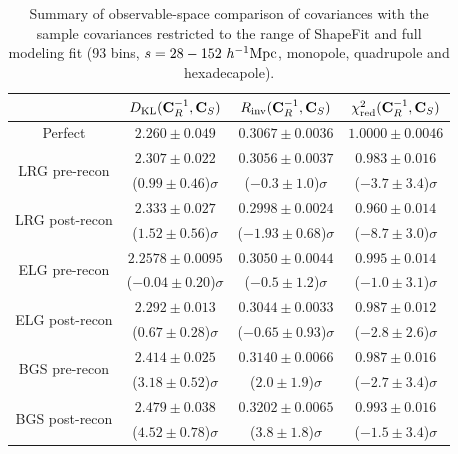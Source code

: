 \begin{table}[tb]
\centering
\begin{tabular}{|c|c|c|c|}
\hline
 & $D_{\rm KL} ({\bf C}_R^{-1}, {\bf C}_S)$ & $R_{\rm inv} ({\bf C}_R^{-1}, {\bf C}_S)$ & $\chi^2_{\rm red} ({\bf C}_R^{-1}, {\bf C}_S)$ \\
\hline
Perfect & $2.260 \pm 0.049$ & $0.3067 \pm 0.0036$ & $1.0000 \pm 0.0046$ \\
\hline
\multirow{2}{*}{LRG pre-recon} & $2.307 \pm 0.022$ & $0.3056 \pm 0.0037$ & $0.983 \pm 0.016$ \\
 & ($0.99 \pm 0.46$)$\sigma$ & ($-0.3 \pm 1.0$)$\sigma$ & ($-3.7 \pm 3.4$)$\sigma$ \\
\hline
\multirow{2}{*}{LRG post-recon} & $2.333 \pm 0.027$ & $0.2998 \pm 0.0024$ & $0.960 \pm 0.014$ \\
 & ($1.52 \pm 0.56$)$\sigma$ & ($-1.93 \pm 0.68$)$\sigma$ & ($-8.7 \pm 3.0$)$\sigma$ \\
\hline
\multirow{2}{*}{ELG pre-recon} & $2.2578 \pm 0.0095$ & $0.3050 \pm 0.0044$ & $0.995 \pm 0.014$ \\
 & ($-0.04 \pm 0.20$)$\sigma$ & ($-0.5 \pm 1.2$)$\sigma$ & ($-1.0 \pm 3.1$)$\sigma$ \\
\hline
\multirow{2}{*}{ELG post-recon} & $2.292 \pm 0.013$ & $0.3044 \pm 0.0033$ & $0.987 \pm 0.012$ \\
 & ($0.67 \pm 0.28$)$\sigma$ & ($-0.65 \pm 0.93$)$\sigma$ & ($-2.8 \pm 2.6$)$\sigma$ \\
\hline
\multirow{2}{*}{BGS pre-recon} & $2.414 \pm 0.025$ & $0.3140 \pm 0.0066$ & $0.987 \pm 0.016$ \\
 & ($3.18 \pm 0.52$)$\sigma$ & ($2.0 \pm 1.9$)$\sigma$ & ($-2.7 \pm 3.4$)$\sigma$ \\
\hline
\multirow{2}{*}{BGS post-recon} & $2.479 \pm 0.038$ & $0.3202 \pm 0.0065$ & $0.993 \pm 0.016$ \\
 & ($4.52 \pm 0.78$)$\sigma$ & ($3.8 \pm 1.8$)$\sigma$ & ($-1.5 \pm 3.4$)$\sigma$ \\
\hline
\end{tabular}
\caption[Observable-space comparison of \rascalc{} covariances with the \desimock{} sample covariances restricted to the range of ShapeFit and full modeling fits]{Summary of observable-space comparison of \rascalc{} covariances with the sample covariances restricted to the range of ShapeFit and full modeling fit (93 bins, $s=28-152~h^{-1}{\rm Mpc}$, monopole, quadrupole and hexadecapole).}
\label{tab:cov-comparison-shape-range}
\end{table}

